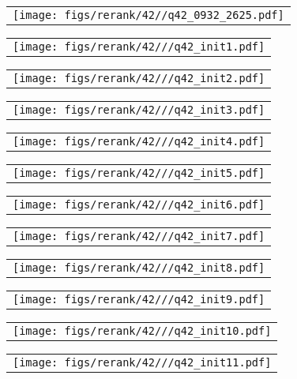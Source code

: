 \begin{figure*}[t]
\vspace{2ex}

\begin{tabular}{@{\sssp}c@{\sssp}}\texttt{[image: figs/rerank/42//q42\_0932\_2625.pdf]}\end{tabular} 
\begin{tabular}{@{\sssp}c@{\sssp}}\texttt{[image: figs/rerank/42///q42\_init1.pdf]}\end{tabular}
\begin{tabular}{@{\sssp}c@{\sssp}}\texttt{[image: figs/rerank/42///q42\_init2.pdf]}\end{tabular}
\begin{tabular}{@{\sssp}c@{\sssp}}\texttt{[image: figs/rerank/42///q42\_init3.pdf]}\end{tabular}
\begin{tabular}{@{\sssp}c@{\sssp}}\texttt{[image: figs/rerank/42///q42\_init4.pdf]}\end{tabular}
\begin{tabular}{@{\sssp}c@{\sssp}}\texttt{[image: figs/rerank/42///q42\_init5.pdf]}\end{tabular}
\begin{tabular}{@{\sssp}c@{\sssp}}\texttt{[image: figs/rerank/42///q42\_init6.pdf]}\end{tabular}
\begin{tabular}{@{\sssp}c@{\sssp}}\texttt{[image: figs/rerank/42///q42\_init7.pdf]}\end{tabular}
\begin{tabular}{@{\sssp}c@{\sssp}}\texttt{[image: figs/rerank/42///q42\_init8.pdf]}\end{tabular}
\begin{tabular}{@{\sssp}c@{\sssp}}\texttt{[image: figs/rerank/42///q42\_init9.pdf]}\end{tabular}
\begin{tabular}{@{\sssp}c@{\sssp}}\texttt{[image: figs/rerank/42///q42\_init10.pdf]}\end{tabular}
\begin{tabular}{@{\sssp}c@{\sssp}}\texttt{[image: figs/rerank/42///q42\_init11.pdf]}\end{tabular}


\end{figure*}
